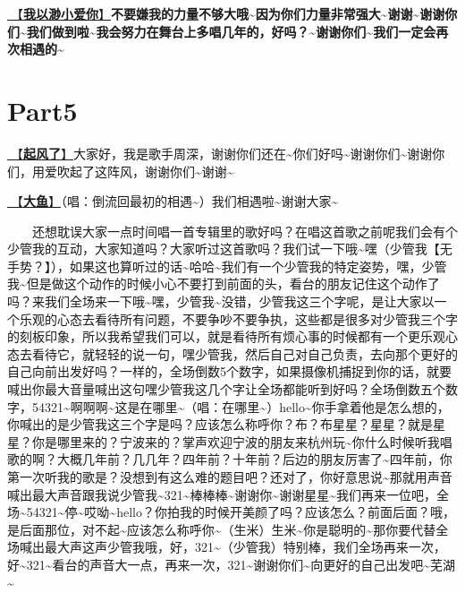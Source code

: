 \documentclass[]{ctexbook}
\begin{document}
\hyperref[loving-you-in-my-humble-way]{🎵【\textbf{我以渺小爱你}】}\textbf{不要嫌我的力量不够大哦\textasciitilde 因为你们力量非常强大\textasciitilde 谢谢\textasciitilde 谢谢你们\textasciitilde 我们做到啦\textasciitilde 我会努力在舞台上多唱几年的，好吗？\textasciitilde 谢谢你们\textasciitilde 我们一定会再次相遇的\textasciitilde{}}

\section{Part5}\label{hangzhou-20240823-part5}

\hyperref[the-wind-rises]{🎵【\textbf{起风了}】}大家好，我是歌手周深，谢谢你们还在\textasciitilde 你们好吗\textasciitilde 谢谢你们\textasciitilde 谢谢你们，用爱吹起了这阵风，谢谢你们\textasciitilde 谢谢\textasciitilde{}

\hyperref[big-fish]{🎵【\textbf{大鱼}】}（唱：倒流回最初的相遇\textasciitilde）我们相遇啦\textasciitilde 谢谢大家\textasciitilde{}

  还想耽误大家一点时间唱一首专辑里的歌好吗？在唱这首歌之前呢我们会有个少管我的互动，大家知道吗？大家听过这首歌吗？我们试一下哦\textasciitilde 嘿（少管我【无手势？】），如果这也算听过的话\textasciitilde 哈哈\textasciitilde 我们有一个少管我的特定姿势，嘿，少管我\textasciitilde 但是做这个动作的时候小心不要打到前面的头，看台的朋友记住这个动作了吗？来我们全场来一下哦\textasciitilde 嘿，少管我\textasciitilde 没错，少管我这三个字呢，是让大家以一个乐观的心态去看待所有问题，不要争吵不要争执，这些都是很多对少管我三个字的刻板印象，所以我希望我们可以，就是看待所有烦心事的时候都有一个更乐观心态去看待它，就轻轻的说一句，嘿少管我，然后自己对自己负责，去向那个更好的自己向前出发好吗？一样的，全场倒数5个数字，如果摄像机捕捉到你的话，就要喊出你最大音量喊出这句嘿少管我这几个字让全场都能听到好吗？全场倒数五个数字，54321\textasciitilde 啊啊啊\textasciitilde 这是在哪里\textasciitilde（唱：在哪里\textasciitilde）hello\textasciitilde 你手拿着他是怎么想的，你喊出的是少管我这三个字是吗？应该怎么称呼你？布？布星星？星星？就是星星？你是哪里来的？宁波来的？掌声欢迎宁波的朋友来杭州玩\textasciitilde 你什么时候听我唱歌的啊？大概几年前？几几年？四年前？十年前？后边的朋友厉害了\textasciitilde 四年前，你第一次听我的歌是？没想到有这么难的题目吧？还对了，你好意思说\textasciitilde 那就用声音喊出最大声音跟我说少管我\textasciitilde321\textasciitilde 棒棒棒\textasciitilde 谢谢你\textasciitilde 谢谢星星\textasciitilde 我们再来一位吧，全场\textasciitilde54321\textasciitilde 停\textasciitilde 哎呦\textasciitilde hello？你拍我的时候开美颜了吗？应该怎么？前面后面？哦，是后面那位，对不起\textasciitilde 应该怎么称呼你\textasciitilde（生米）生米\textasciitilde 你是聪明的\textasciitilde 那你要代替全场喊出最大声这声少管我哦，好，321\textasciitilde（少管我）特别棒，我们全场再来一次，好\textasciitilde321\textasciitilde 看台的声音大一点，再来一次，321\textasciitilde 谢谢你们\textasciitilde 向更好的自己出发吧\textasciitilde 芜湖\textasciitilde{}
\end{document}
